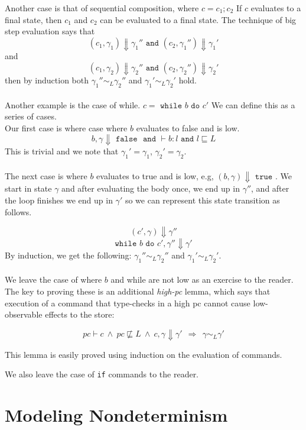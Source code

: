 \documentclass{article}
\begin{document}
Another case is that of sequential composition, where $c=c_1; c_2$ If $c$ evaluates to a final state, then $c_1$ and $c_2$ can be evaluated to a final state. The technique of big step evaluation says that \[(c_1, \gamma_1 )\Downarrow \gamma_1'' \texttt{ and }(c_2, \gamma_1'')\Downarrow \gamma_1'\] 
and 
\[(c_1, \gamma_2) \Downarrow \gamma_2'' \texttt{ and } ( c_2, \gamma_2'') \Downarrow \gamma_2'\]
then by induction both $\gamma_1'' \sim_L \gamma_2''$  and $\gamma_1' \sim_L \gamma_2'$ hold.\\\\
Another example is the case of while.  $c=\texttt{ while } b \texttt{ do } c'$
We can define this as  a series of cases. \\
Our first case is where case where $b$ evaluates to false and is low. \[b, \gamma \Downarrow \texttt{ false } \texttt{ and } \vdash b: l \texttt{ and } l \sqsubseteq{} L \] 
This is trivial and we note that  $\gamma_1'= \gamma_1$, $\gamma_2'=\gamma_2$.\\\\
    The next case is where $b$ evaluates to true and is low, e.g, $(b, \gamma ) \Downarrow \texttt{ true }$. We start in state $\gamma$ and after evaluating the body once, we end up in $\gamma''$, and after the loop finishes we end up in $\gamma'$ so we can represent this state transition as follows.
    
    \[(c', γ) ⇓ γ''\]
    \[\texttt{while } b \texttt{ do } c', γ''⇓γ'\]
      By induction, we get the following: $\gamma_1'' \sim_L \gamma_2''$ and $\gamma_1' \sim_L\gamma_2'$.\\\\
        
        We leave the case of where $b$ and while are not low as an exercise to the reader. The key to proving these is an additional \emph{high-pc} lemma, which says that execution of a command that type-checks in a high pc cannot cause low-observable effects to the store:
       
        \[
          pc ⊢ c ~∧~ pc \not\sqsubseteq L ~∧~ c,γ⇓γ' ~~⇒~~
          γ\sim_L γ'
        \]
    
        This lemma is easily proved using induction on the evaluation of commands.
        
        We also leave the case of \texttt{if} commands to the reader.

\section{Modeling Nondeterminism}
\end{document}
